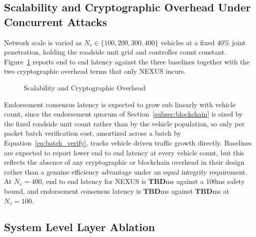\documentclass[lettersize,journal]{IEEEtran}
\theoremstyle{plain}
\theoremstyle{remark}
\newcommand{\TBD}{\textbf{TBD}} %
\begin{document}
	
	\subsection{Scalability and Cryptographic Overhead Under Concurrent Attacks}\label{subsec:n2}
	
	Network scale is varied as $N_v \in \{100,200,300,400\}$ vehicles at a
	fixed $40\%$ joint penetration, holding the roadside unit grid and
	controller count constant. Figure~\ref{fig:n2_scale} reports end to end
	latency against the three baselines together with the two cryptographic
	overhead terms that only NEXUS incurs.
	\begin{figure}[!t]
		\centering
		\caption{Scalability and Cryptographic Overhead}
		\label{fig:n2_scale}
	\end{figure}
	Endorsement consensus latency is expected to grow sub linearly with
	vehicle count, since the endorsement quorum of Section~\ref{subsec:blockchain}
	is sized by the fixed roadside unit count rather than by the vehicle
	population, so only per packet batch verification cost, amortized
	across a batch by Equation~\eqref{eq:batch_verify}, tracks vehicle
	driven traffic growth directly. Baselines are expected to report lower
	end to end latency at every vehicle count, but this reflects the absence
	of any cryptographic or blockchain overhead in their design rather than
	a genuine efficiency advantage under an equal integrity requirement. At
	$N_v{=}400$, end to end latency for NEXUS is $\TBD$ms against a
	$100$ms safety bound, and endorsement consensus latency is $\TBD$ms
	against $\TBD$ms at $N_v{=}100$.
	
	
	\subsection{System Level Layer Ablation}\label{subsec:n3}
	
\end{document}
